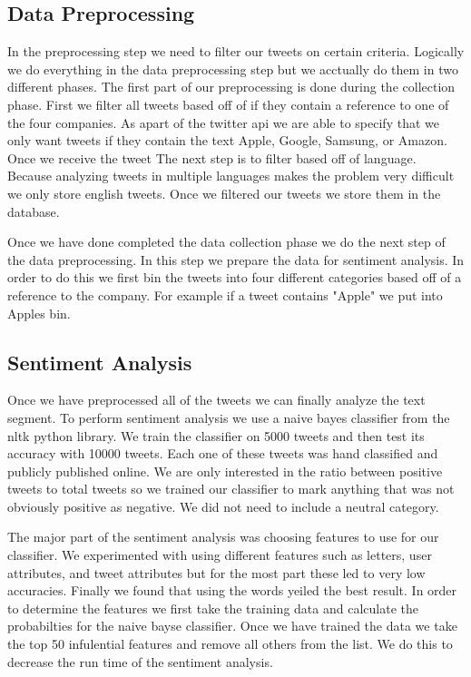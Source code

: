 \documentclass{acm_proc_article-sp}
\begin{document}
\subsection{Data Preprocessing}

In the preprocessing step we need to filter our tweets on certain criteria.
Logically we do everything in the data preprocessing step but we acctually do
them in two different phases. The first part of our preprocessing is done
during the collection phase. First we filter all tweets based off of if they
contain a reference to one of the four companies. As apart of the twitter api
we are able to specify that we only want tweets if they contain the text Apple,
Google, Samsung, or Amazon. Once we receive the tweet The next step is to
filter based off of language. Because analyzing tweets in multiple languages
makes the problem very difficult we only store english tweets. Once we filtered
our tweets we store them in the database.

Once we have done completed the data collection phase we do the next step of
the data preprocessing. In this step we prepare the data for sentiment
analysis. In order to do this we first bin the tweets into four different
categories based off of a reference to the company. For example if a tweet
contains "Apple" we put into Apples bin.  

\subsection{Sentiment Analysis}

Once we have preprocessed all of the tweets we can finally analyze the text
segment. To perform sentiment analysis we use a naive bayes classifier from the
nltk python library. We train the classifier on 5000 tweets and then test its
accuracy with 10000 tweets. Each one of these tweets was hand classified and
publicly published online. We are only interested in the ratio between positive
tweets to total tweets so we trained our classifier to mark anything that was
not obviously positive as negative. We did not need to include a neutral
category.

The major part of the sentiment analysis was choosing features to use for our
classifier. We experimented with using different features such as letters, user
attributes, and tweet attributes but for the most part these led to very low
accuracies. Finally we found that using the words yeiled the best result. In
order to determine the features we first take the training data and calculate
the probabilties for the naive bayse classifier. Once we have trained the data
we take the top 50 infulential features and remove all others from the list. We
do this to decrease the run time of the sentiment analysis.
\end{document}
